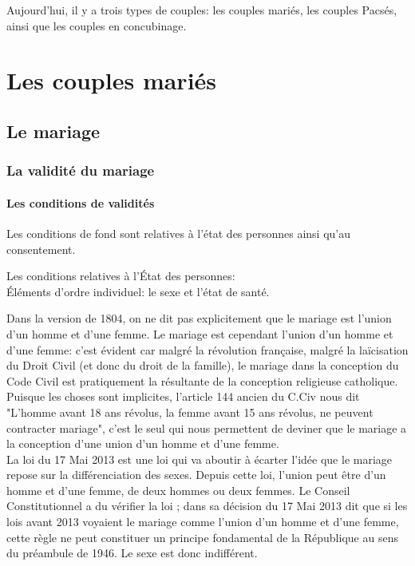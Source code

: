 \documentclass[12pt, a4paper, openany]{book}
\begin{document}
Aujourd'hui, il y a trois types de couples: les couples mariés, les couples Pacsés, ainsi que les couples en concubinage.

\chapter{Les couples mariés}

\section{Le mariage}

\subsection{La validité du mariage}

\subsubsection{Les conditions de validités}

Les conditions de fond sont relatives à l'état des personnes ainsi qu'au consentement.


Les conditions relatives à l'État des personnes: \\
Éléments d'ordre individuel: le sexe et l'état de santé.


Dans la version de 1804, on ne dit pas explicitement que le mariage est l'union d'un homme et d'une femme. Le mariage est cependant l'union d'un homme et d'une femme: c'est évident car malgré la révolution française, malgré la laïcisation du Droit Civil (et donc du droit de la famille), le mariage dans la conception du Code Civil est pratiquement la résultante de la conception religieuse catholique. Puisque les choses sont implicites, l'article 144 ancien du C.Civ nous dit "L'homme avant 18 ans révolus, la femme avant 15 ans révolus, ne peuvent contracter mariage", c'est le seul qui nous permettent de deviner que le mariage a la conception d'une union d'un homme et d'une femme. \\
La loi du 17 Mai 2013 est une loi qui va aboutir à écarter l'idée que le mariage repose sur la différenciation des sexes. Depuis cette loi, l'union peut être d'un homme et d'une femme, de deux hommes ou deux femmes. Le Conseil Constitutionnel a du vérifier la loi ; dans sa décision du 17 Mai 2013 dit que si les lois avant 2013 voyaient le mariage comme l'union d'un homme et d'une femme, cette règle ne peut constituer un principe fondamental de la République au sens du préambule de 1946. Le sexe est donc indifférent.
\end{document}
